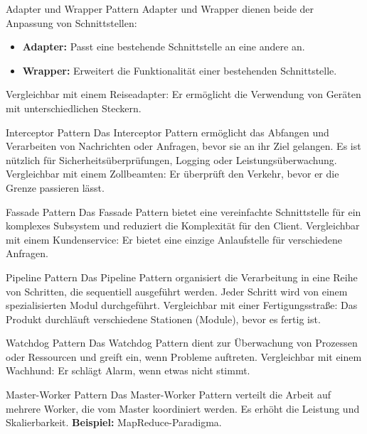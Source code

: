 \documentclass{beamer}
\begin{document}
\begin{frame}{Adapter und Wrapper Pattern}
    Adapter und Wrapper dienen beide der Anpassung von Schnittstellen:
    \begin{itemize}
        \item \textbf{Adapter:} Passt eine bestehende Schnittstelle an eine andere an.
        \item \textbf{Wrapper:} Erweitert die Funktionalität einer bestehenden Schnittstelle.
    \end{itemize}
    Vergleichbar mit einem Reiseadapter: Er ermöglicht die Verwendung von Geräten mit unterschiedlichen Steckern.
\end{frame}

\begin{frame}{Interceptor Pattern}
    Das Interceptor Pattern ermöglicht das Abfangen und Verarbeiten von Nachrichten oder Anfragen, bevor sie an ihr Ziel gelangen. Es ist nützlich für Sicherheitsüberprüfungen, Logging oder Leistungsüberwachung. Vergleichbar mit einem Zollbeamten: Er überprüft den Verkehr, bevor er die Grenze passieren lässt.
\end{frame}

\begin{frame}{Fassade Pattern}
    Das Fassade Pattern bietet eine vereinfachte Schnittstelle für ein komplexes Subsystem und reduziert die Komplexität für den Client. Vergleichbar mit einem Kundenservice: Er bietet eine einzige Anlaufstelle für verschiedene Anfragen.
\end{frame}

\begin{frame}{Pipeline Pattern}
    Das Pipeline Pattern organisiert die Verarbeitung in eine Reihe von Schritten, die sequentiell ausgeführt werden. Jeder Schritt wird von einem spezialisierten Modul durchgeführt. Vergleichbar mit einer Fertigungsstraße: Das Produkt durchläuft verschiedene Stationen (Module), bevor es fertig ist.
\end{frame}

\begin{frame}{Watchdog Pattern}
    Das Watchdog Pattern dient zur Überwachung von Prozessen oder Ressourcen und greift ein, wenn Probleme auftreten. Vergleichbar mit einem Wachhund: Er schlägt Alarm, wenn etwas nicht stimmt.
\end{frame}

\begin{frame}{Master-Worker Pattern}
    Das Master-Worker Pattern verteilt die Arbeit auf mehrere Worker, die vom Master koordiniert werden. Es erhöht die Leistung und Skalierbarkeit. \newline \textbf{Beispiel:} MapReduce-Paradigma.
\end{frame}
\end{document}
